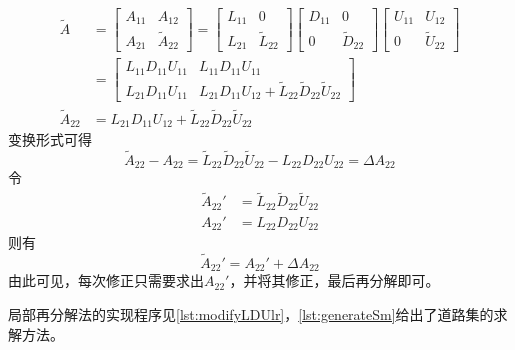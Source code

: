 \documentclass[a4paper,12pt]{article}
\begin{document}
    \begin{equation}
      \begin{aligned}
        \widetilde A &= \begin{bmatrix}
          A_{11}&A_{12}\\A_{21}&\widetilde A_{22}
        \end{bmatrix}=\begin{bmatrix}
          L_{11}&0\\L_{21}&\widetilde L_{22}
        \end{bmatrix} \begin{bmatrix}
          D_{11}&0\\0&\widetilde D_{22}
        \end{bmatrix} \begin{bmatrix}
          U_{11}&U_{12}\\0&\widetilde U_{22}
        \end{bmatrix} \\
      &=\begin{bmatrix}
        L_{11}D_{11}U_{11} & L_{11}D_{11}U_{11}\\
        L_{21}D_{11}U_{11} & L_{21}D_{11}U_{12} + \widetilde L_{22}\widetilde D_{22}\widetilde U_{22}
      \end{bmatrix} \\
        \widetilde A_{22} &= L_{21}D_{11}U_{12} + \widetilde L_{22}\widetilde D_{22}\widetilde U_{22}
      \end{aligned}
    \end{equation}
    变换形式可得
    \begin{equation}
      \widetilde A_{22}-A_{22}=\widetilde L_{22}\widetilde D_{22}\widetilde U_{22}-L_{22}D_{22}U_{22}=\Delta A_{22}
    \end{equation}
    令
    \begin{equation}
      \begin{aligned}
        \widetilde A_{22}'&=\widetilde L_{22}\widetilde D_{22}\widetilde U_{22}\\
        A_{22}'&=L_{22}D_{22}U_{22}
      \end{aligned}
    \end{equation}
    则有
    \begin{equation}
      \widetilde A_{22}'=A_{22}'+\Delta A_{22}
    \end{equation}
    由此可见，每次修正只需要求出$A_{22}'$，并将其修正，最后再分解即可。

    局部再分解法的实现程序见\cref{lst:modifyLDUlr}，\cref{lst:generateSm}给出了道路集的求解方法。
\end{document}
